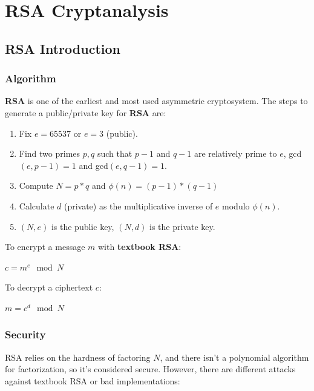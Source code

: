 \documentclass[a4paper,12pt]{report}
\begin{document}
\chapter{RSA Cryptanalysis}

\section{RSA Introduction}

\subsection{Algorithm}

\textbf{RSA} is one of the earliest and most used asymmetric cryptosystem.
The steps to generate a public/private key for \textbf{RSA} are:

\begin{enumerate}
    \item Fix $e = 65537$ or $e = 3$ (public).
    \item Find two primes $p, q$ such that $p - 1$ and $q - 1$ are relatively prime to $e$, gcd$(e, p-1) = 1$ and gcd$(e, q-1) = 1$.
    \item Compute $N = p * q$ and $\phi(n) = (p-1) * (q-1)$
    \item Calculate $d$ (private) as the multiplicative inverse of $e$ modulo $\phi(n)$.
    \item $(N, e)$ is the public key, $(N, d)$ is the private key.
\end{enumerate}

To encrypt a message $m$ with \textbf{textbook RSA}:

\begin{center}
    $c = m^e \mod N$
\end{center}

To decrypt a ciphertext $c$:

\begin{center}
    $m = c^d \mod N$
\end{center}

\subsection{Security}

RSA relies on the hardness of factoring $N$, and there isn't a polynomial algorithm for factorization, so it's considered secure.
However, there are different attacks against textbook RSA or bad implementations:
\end{document}
